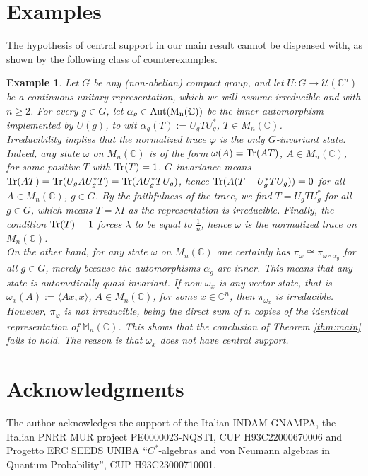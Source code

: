 \documentclass[12pt]{amsart}
\numberwithin{equation}{section}
\def\cu{{\mathcal U}}
\def\a{\alpha}
\def\om{\omega} \def\Om{\Omega}
\newtheorem{example}[thm]{Example}
\theoremstyle{definition}
\begin{document}
\section{Examples}
The hypothesis of central support in our main result cannot be dispensed with, as shown by the following class of counterexamples.
\begin{example}
\label{exa:support}
\emph{Let $G$ be any (non-abelian) compact group, and let $U: G\rightarrow \cu(\mathbb{C}^n)$ be a continuous unitary representation, which we will
assume irreducible and with $n\geq 2$. For every $g\in G$, let $\a_g\in{\rm Aut(M_n(\mathbb{C}))}$ be the inner
automorphism implemented by $U(g)$, to wit $\a_g(T):= U_g T U_g^*$, $T\in M_n(\mathbb{C})$.\\
Irreducibility implies that the normalized trace $\varphi$ is the only $G$-invariant state. Indeed, any state $\om$
on $M_n(\mathbb{C})$ is of the form $\om(A)= {\rm Tr} (AT)$, $A\in M_n(\mathbb{C})$, for some positive
$T$ with ${\rm Tr}(T)=1$. $G$-invariance means ${\rm Tr}(AT)={\rm Tr} (U_gAU_g^*T)={\rm Tr} (AU_g^*T U_g) $, hence ${\rm Tr}(A(T-U_g^*TU_g))=0$ for all $A\in M_n(\mathbb{C})$, $g\in G$. By the faithfulness of the trace, we find
$T=U_gTU_g^*$ for all $g\in G$, which means $T=\lambda I$ as the representation is irreducible. Finally, the condition
${\rm Tr}(T)=1$ forces $\lambda$ to be equal to $\frac{1}{n}$, hence $\om$ is the normalized trace on $M_n(\mathbb{C})$.\\
On the other hand, for any state $\om$ on $M_n(\mathbb{C})$ one certainly has $\pi_\om\cong \pi_{\om\circ\a_g}$ for all $g\in G$, merely because the automorphisms $\a_g$ are  inner. This means that any state is automatically 
quasi-invariant. If now $\om_x$ is any vector state, that is $\om_x(A):= \langle Ax, x \rangle $, $A\in M_n(\mathbb{C})$, for some $x\in \mathbb{C}^n$, then $\pi_{\om_x}$ is irreducible. However, $\pi_\varphi$ is not irreducible, being the direct sum of $n$ copies of the identical representation of $\mathbb{M}_n(\mathbb{C})$. This shows that the conclusion of Theorem \ref{thm:main} fails to hold. The reason is that $\om_x$ does not have central support.}
\end{example}

\section*{Acknowledgments}
\noindent
The author acknowledges the support of the Italian INDAM-GNAMPA, the Italian PNRR MUR project PE0000023-NQSTI, CUP H93C22000670006 and Progetto ERC SEEDS UNIBA ``$C^*$-algebras and von Neumann algebras in Quantum Probability'', CUP H93C23000710001.
\end{document}
